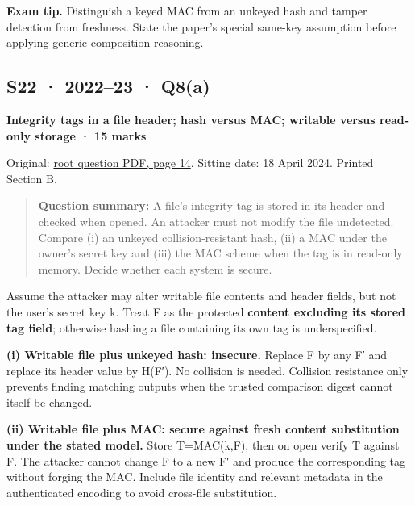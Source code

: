 \documentclass[11pt,a4paper]{article}
\begin{document}
{\color{ForestGreen}\textbf{Exam tip.} Distinguish a keyed MAC from an unkeyed hash and tamper detection from freshness. State the paper’s special same-key assumption before applying generic composition reasoning.}




\clearpage
\subsection{S22 · 2022–23 · Q8(a)}\label{s22}

\textbf{Integrity tags in a file header; hash versus MAC; writable versus read-only storage · 15 marks}


Original: \href{../../CSE405-Security_Merged.pdf\#page=14}{root question PDF,\allowbreak{} page 14}. Sitting date: 18 April 2024. Printed Section B.



\begin{quote}\small

\textbf{Question summary:} A file’s integrity tag is stored in its header and checked when opened. An attacker must not modify the file undetected. Compare (i) an unkeyed collision-resistant hash,\allowbreak{} (ii) a MAC under the owner’s secret key and (iii) the MAC scheme when the tag is in read-only memory. Decide whether each system is secure.



\end{quote}

Assume the attacker may alter writable file contents and header fields,\allowbreak{} but not the user’s secret key k. Treat F as the protected \textbf{content excluding its stored tag field}; otherwise hashing a file containing its own tag is underspecified.


\textbf{(i) Writable file plus unkeyed hash: insecure.} Replace F by any F′ and replace its header value by H(F′). No collision is needed. Collision resistance only prevents finding matching outputs when the trusted comparison digest cannot itself be changed.


\textbf{(ii) Writable file plus MAC: secure against fresh content substitution under the stated model.} Store T=\allowbreak{}MAC(k,\allowbreak{}F),\allowbreak{} then on open verify T against F. The attacker cannot change F to a new F′ and produce the corresponding tag without forging the MAC. Include file identity and relevant metadata in the authenticated encoding to avoid cross-file substitution.
\end{document}

